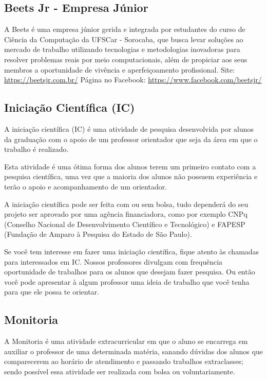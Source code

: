\subsection{Beets Jr - Empresa Júnior}
A Beets é uma empresa júnior gerida e integrada por estudantes do curso de Ciência da Computação da UFSCar - Sorocaba, que busca levar soluções ao mercado de trabalho utilizando tecnologias e metodologias inovadoras para resolver problemas reais por meio computacionais, além de propiciar aos seus membros a oportunidade de vivência e aperfeiçoamento profissional. \newline Site: \url{https://beetsjr.com.br/} \newline Página no Facebook: \url{https://www.facebook.com/beetsjr/}

\subsection{Iniciação Científica (IC)}
A iniciação científica (IC) é uma atividade de pesquisa desenvolvida por alunos da graduação com o apoio de um professor orientador que seja da área em que o trabalho é realizado.

Esta atividade é uma ótima forma dos alunos terem um primeiro contato com a pesquisa científica, uma vez que a maioria dos alunos não possuem experiência e terão o apoio e acompanhamento de um orientador.

A iniciação científica pode ser feita com ou sem bolsa, tudo dependerá do seu projeto ser aprovado por uma agência financiadora,  como por exemplo CNPq (Conselho Nacional de Desenvolvimento Científico e Tecnológico) e FAPESP (Fundação de Amparo à Pesquisa do Estado de São Paulo). 

Se você tem interesse em fazer uma iniciação científica, fique atento às chamadas para interessados em IC. Nossos professores divulgam com frequência oportunidade de trabalhos para os alunos que desejam fazer pesquisa. Ou então você pode apresentar à algum professor uma ideia de trabalho que você tenha para que ele possa te orientar.

\subsection{Monitoria}
A Monitoria é uma atividade extracurricular em que o aluno se encarrega em auxiliar o professor de uma determinada matéria, sanando dúvidas dos alunos que comparecerem ao horário de atendimento e passando trabalhos extraclasses; sendo possível essa atividade ser realizada com bolsa ou voluntariamente.

